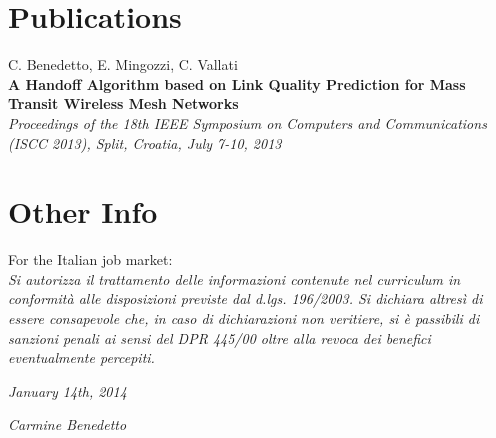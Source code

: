 \documentclass[]{friggeri-cv}
\begin{document}
\section{Publications}
C. Benedetto, E. Mingozzi, C. Vallati\\
\textbf{A Handoff Algorithm based on Link Quality Prediction for Mass Transit Wireless Mesh Networks}\\
\emph{Proceedings of the 18th IEEE Symposium on Computers and Communications (ISCC 2013), Split, Croatia, July 7-10, 2013}
\\
\section{Other Info}
For the Italian job market:\\
\emph{Si autorizza il trattamento delle informazioni contenute nel curriculum in conformità alle disposizioni previste dal d.lgs. 196/2003. Si dichiara altresì di essere consapevole che, in caso di dichiarazioni non veritiere, si è passibili di sanzioni penali ai sensi del DPR 445/00 oltre alla revoca dei benefici eventualmente percepiti.}
\\
\begin{flushleft}
\emph{January 14th, 2014}
\end{flushleft}
\begin{flushright}
\emph{Carmine Benedetto}
\end{flushright}

% 
\end{document}
